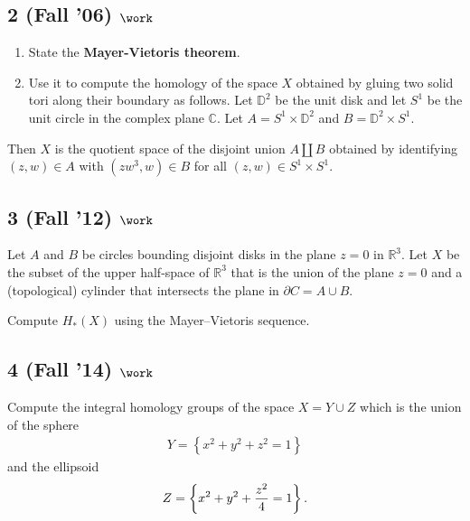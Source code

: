 \hypertarget{fall-06-work-1}{%
\subsection{\texorpdfstring{2 (Fall '06)
\(\work\)}{2 (Fall '06) \textbackslash work}}\label{fall-06-work-1}}

\begin{enumerate}
\def\labelenumi{\alph{enumi}.}
\item
  State the \textbf{Mayer-Vietoris theorem}.
\item
  Use it to compute the homology of the space \(X\) obtained by gluing
  two solid tori along their boundary as follows. Let \({\mathbb{D}}^2\)
  be the unit disk and let \(S^1\) be the unit circle in the complex
  plane \({\mathbb{C}}\). Let \(A = S^1 \times {\mathbb{D}}^2\) and
  \(B = {\mathbb{D}}^2 \times S^1\).
\end{enumerate}

Then \(X\) is the quotient space of the disjoint union
\(A {\textstyle\coprod}B\) obtained by identifying \((z, w) \in A\) with
\((zw^3 , w) \in B\) for all \((z, w) \in S^1 \times S^1\).

\hypertarget{fall-12-work-2}{%
\subsection{\texorpdfstring{3 (Fall '12)
\(\work\)}{3 (Fall '12) \textbackslash work}}\label{fall-12-work-2}}

Let \(A\) and \(B\) be circles bounding disjoint disks in the plane
\(z = 0\) in \({\mathbb{R}}^3\). Let \(X\) be the subset of the upper
half-space of \({\mathbb{R}}^3\) that is the union of the plane
\(z = 0\) and a (topological) cylinder that intersects the plane in
\(\partial C = A \cup B\).

Compute \(H_* (X)\) using the Mayer--Vietoris sequence.

\hypertarget{fall-14-work-3}{%
\subsection{\texorpdfstring{4 (Fall '14)
\(\work\)}{4 (Fall '14) \textbackslash work}}\label{fall-14-work-3}}

Compute the integral homology groups of the space \(X = Y \cup Z\) which
is the union of the sphere
\begin{align*}
Y = \left\{{x^2 + y^2 + z^2 = 1}\right\}
\end{align*}
and the ellipsoid
\begin{align*}
Z =  \left\{{x^2 + y^2 + {z^2 \over 4} = 1}\right\}
.\end{align*}

